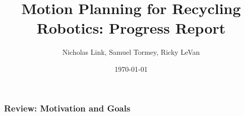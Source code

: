 \documentclass{beamer}
\title[Recycle Robot]{Motion Planning for Recycling Robotics: Progress Report} %
\author[Link, Tormey, LeVan]{Nicholas Link, Samuel Tormey, Ricky LeVan} %
\date{\today} %
\begin{document}
\begin{frame}
\titlepage %

\end{frame}

\begin{frame}
\frametitle{Review: Motivation and Goals}

\end{frame}


\begin{frame}

\end{frame}



\begin{frame}

\end{frame}



\begin{frame}

\end{frame}
\end{document}
